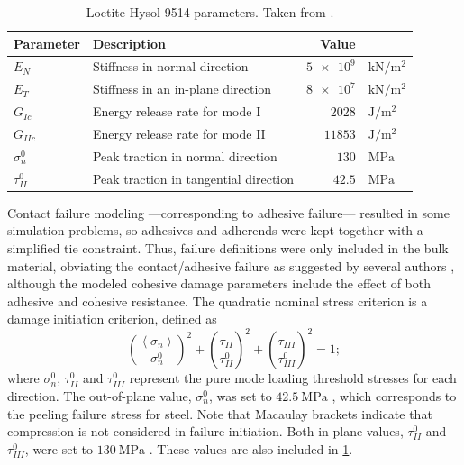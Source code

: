 \documentclass[cmfonts]{witpress}
\begin{document}
\begin{table}
	\centering
	\begin{tabular}{llrl}
	\hline
		Parameter & Description & Value & \\
		\hline
		$E_{N}$ & Stiffness in normal direction & $\num{5e9}$ & $\si{\kN/\m^2}$ \\
		$E_{T}$ & Stiffness in an in-plane direction & $\num{8e7}$ & $\si{\kN/\m^2}$ \\
		$G_{Ic}$ & Energy release rate for mode I & $\num{2028}$ & $\si{\J/\m^2}$ \\
		$G_{IIc}$ & Energy release rate for mode II & $\num{11853}$ & $\si{\J/\m^2}$ \\
		$\sigma_{n}^{0}$ & Peak traction in normal direction & $\num{130}$ & $\si{\MPa}$ \\
		$\tau_{II}^{0}$ & Peak traction in tangential direction & $\num{42.5}$ & $\si{\MPa}$ \\
		\hline
	\end{tabular}
	\caption[Loctite Hysol 9514 parameters.]{Loctite Hysol 9514 parameters. Taken from \cite{Scattina2011}.}
	\label{tab:ads_params}
\end{table}

Contact failure modeling ---corresponding to adhesive failure--- resulted in some simulation problems, so adhesives and adherends were kept together with a simplified tie constraint. Thus, failure definitions were only included in the bulk material, obviating the contact/adhesive failure as suggested by several authors \cite{Greve2007, Loureiro2010, Sadowski2010, Sadowski2011, Scattina2011, Sadowski2014, SernaMoreno2015}, although the modeled cohesive damage parameters include the effect of both adhesive and cohesive resistance. The quadratic nominal stress criterion is a damage initiation criterion, defined as
\begin{equation}
\left(\frac{\left<\sigma_{n}\right>}{\sigma_{n}^{0}}\right)^{2} + \left(\frac{\tau_{II}}{\tau_{II}^{0}}\right)^{2} + \left(\frac{\tau_{III}}{\tau_{III}^{0}}\right)^{2} = 1 ;
\label{eq:quads}
\end{equation}
where $\sigma_{n}^{0}$, $\tau_{II}^{0}$ and $\tau_{III}^{0}$ represent the pure mode loading threshold stresses for each direction. The out-of-plane value, $\sigma_{n}^{0}$, was set to $\SI{42.5}{\MPa}$ \cite{Scattina2011}, which corresponds to the peeling failure stress for steel. Note that Macaulay brackets indicate that compression is not considered in failure initiation. Both in-plane values, $\tau_{II}^{0}$ and $\tau_{III}^{0}$, were set to $\SI{130}{\MPa}$ \cite{Scattina2011}. These values are also included in \cref{tab:ads_params}. %
\end{document}
